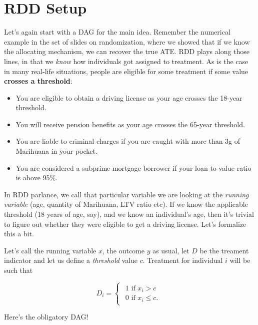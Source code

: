 \documentclass[]{book}
\providecommand{\tightlist}{%
  \setlength{\itemsep}{0pt}\setlength{\parskip}{0pt}}
\begin{document}
\hypertarget{rdd-setup}{%
\section{RDD Setup}\label{rdd-setup}}

Let's again start with a DAG for the main idea. Remember the numerical example in the set of slides on randomization, where we showed that if we know the allocating mechanism, we can recover the true ATE. RDD plays along those lines, in that we \emph{know} how individuals got assigned to treatment. As is the case in many real-life situations, people are eligible for some treatment if some value \textbf{crosses a threshold}:

\begin{itemize}
\tightlist
\item
  You are eligible to obtain a driving license as your age crosses the 18-year threshold.
\item
  You will receive pension benefits as your age crosses the 65-year threshold.
\item
  You are liable to criminal charges if you are caught with more than 3g of Marihuana in your pocket.
\item
  You are considered a subprime mortgage borrower if your loan-to-value ratio is above 95\%.
\end{itemize}

In RDD parlance, we call that particular variable we are looking at the \emph{running variable} (age, quantity of Marihuana, LTV ratio etc). If we know the applicable threshold (18 years of age, say), and we know an individual's age, then it's trivial to figure out whether they were eligible to get a driving license. Let's formalize this a bit.

Let's call the running variable \(x\), the outcome \(y\) as usual, let \(D\) be the treament indicator and let us define a \emph{threshold} value \(c\). Treatment for individual \(i\) will be such that

\begin{equation*}
D_i = \begin{cases}\begin{array}{c}1\text{ if }x_i > c \\
                  0\text{ if }x_i \leq c. \end{array}
                  \end{cases}
\end{equation*}

Here's the obligatory DAG!
\end{document}
